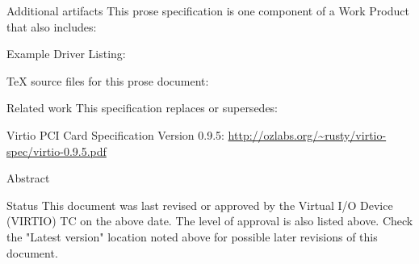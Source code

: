 \begin{titlepage}
\begin{oasistitlesection}{Additional artifacts}
This prose specification is one component of a Work Product that also includes:
\begin{itemize*}
	\item Example Driver Listing: \newline
	\virtiourllistings
	\item TeX source files for this prose document:\newline
	\virtiourltex
\end{itemize*}
\end{oasistitlesection}
\vspace{-0.2in}

\begin{oasistitlesection}{Related work}
This specification replaces or supersedes:
\begin{itemize*}
	\item Virtio PCI Card Specification Version 0.9.5:\newline
	\url{http://ozlabs.org/~rusty/virtio-spec/virtio-0.9.5.pdf}
\end{itemize*}
\end{oasistitlesection}
\vspace{-0.2in}

\vfill\newpage

\begin{oasistitlesection}{Abstract}

\end{oasistitlesection}

\begin{oasistitlesection}{Status}
This document was last revised or approved by the Virtual I/O Device
(VIRTIO) TC on the above date. The level of approval is also listed above. Check the "Latest version" location noted above for possible later revisions of this document.


\end{oasistitlesection}
\end{titlepage}
